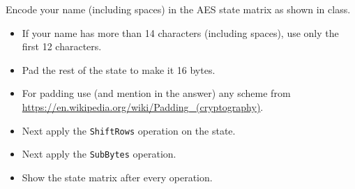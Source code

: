 \documentclass[10pt, a4paper]{article}
\begin{document}
\newpage
\begin{Problem}
	Encode your name (including spaces) in the AES state matrix as shown in class.
	\begin{itemize}
		\item If your name has more than 14 characters (including spaces), use only the first 12 characters.
		\item Pad the rest of the state to make it 16 bytes.
		\item  For padding use (and mention in the answer) any scheme from \\ \url{https://en.wikipedia.org/wiki/Padding_(cryptography)}.
		\item Next apply the \texttt{ShiftRows} operation on the state.
		\item Next apply the \texttt{SubBytes} operation.
		\item Show the state matrix after every operation.
	\end{itemize}
\end{Problem}
\end{document}
